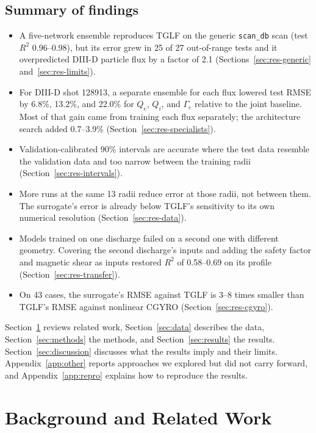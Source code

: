 \documentclass[12pt,letterpaper]{article}
\begin{document}
\subsection{Summary of findings}

\begin{itemize}
  \item A five-network ensemble reproduces TGLF on the generic \texttt{scan\_db} scan
        (test $R^2$ 0.96--0.98), but its error grew in 25 of 27 out-of-range tests and it
        overpredicted DIII-D particle flux by a factor of 2.1 (Sections~\ref{sec:res-generic}
        and~\ref{sec:res-limits}).
  \item For DIII-D shot 128913, a separate ensemble for each flux lowered test RMSE by
        6.8\%, 13.2\%, and 22.0\% for $Q_e$, $Q_i$, and $\Gamma_e$ relative to the joint
        baseline. Most of that gain came from training each flux separately; the
        architecture search added 0.7--3.9\% (Section~\ref{sec:res-specialists}).
  \item Validation-calibrated 90\% intervals are accurate where the test data resemble
        the validation data and too narrow between the training radii
        (Section~\ref{sec:res-intervals}).
  \item More runs at the same 13 radii reduce error at those radii, not between them.
        The surrogate's error is already below TGLF's sensitivity to its own numerical
        resolution (Section~\ref{sec:res-data}).
  \item Models trained on one discharge failed on a second one with different geometry.
        Covering the second discharge's inputs and adding the safety factor and magnetic
        shear as inputs restored $R^2$ of 0.58--0.69 on its profile
        (Section~\ref{sec:res-transfer}).
  \item On 43 cases, the surrogate's RMSE against TGLF is 3--8 times smaller than TGLF's
        RMSE against nonlinear CGYRO (Section~\ref{sec:res-cgyro}).
\end{itemize}

Section~\ref{sec:background} reviews related work, Section~\ref{sec:data} describes the
data, Section~\ref{sec:methods} the methods, and Section~\ref{sec:results} the results.
Section~\ref{sec:discussion} discusses what the results imply and their limits.
Appendix~\ref{app:other} reports approaches we explored but did not carry forward, and
Appendix~\ref{app:repro} explains how to reproduce the results.

\section{Background and Related Work}
\label{sec:background}
\end{document}
